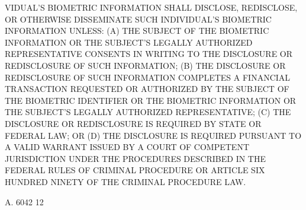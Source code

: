  VIDUAL'S BIOMETRIC INFORMATION SHALL DISCLOSE, REDISCLOSE, OR  OTHERWISE
 DISSEMINATE SUCH INDIVIDUAL'S BIOMETRIC INFORMATION UNLESS:
   (A)  THE SUBJECT OF THE BIOMETRIC INFORMATION OR THE SUBJECT'S LEGALLY
 AUTHORIZED REPRESENTATIVE CONSENTS  IN  WRITING  TO  THE  DISCLOSURE  OR
 REDISCLOSURE OF SUCH INFORMATION;
   (B)  THE  DISCLOSURE  OR  REDISCLOSURE OF SUCH INFORMATION COMPLETES A
 FINANCIAL TRANSACTION REQUESTED OR AUTHORIZED  BY  THE  SUBJECT  OF  THE
 BIOMETRIC  IDENTIFIER  OR  THE  BIOMETRIC  INFORMATION  OR THE SUBJECT'S
 LEGALLY AUTHORIZED REPRESENTATIVE;
   (C) THE DISCLOSURE OR REDISCLOSURE IS REQUIRED  BY  STATE  OR  FEDERAL
 LAW; OR
   (D) THE DISCLOSURE IS REQUIRED PURSUANT TO A VALID WARRANT ISSUED BY A
 COURT  OF  COMPETENT  JURISDICTION UNDER THE PROCEDURES DESCRIBED IN THE
 FEDERAL RULES OF CRIMINAL PROCEDURE OR ARTICLE SIX HUNDRED NINETY OF THE
 CRIMINAL PROCEDURE LAW.

 A. 6042                            12
 
